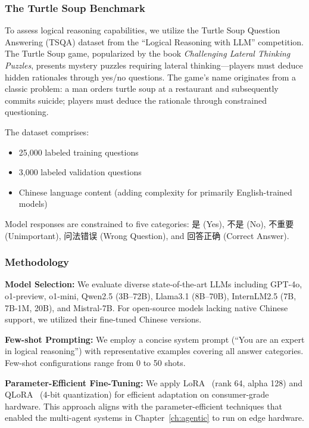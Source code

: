 \subsubsection{The Turtle Soup Benchmark}

To assess logical reasoning capabilities, we utilize the Turtle Soup Question Answering (TSQA) dataset from the ``Logical Reasoning with LLM'' competition. The Turtle Soup game, popularized by the book \textit{Challenging Lateral Thinking Puzzles}, presents mystery puzzles requiring lateral thinking---players must deduce hidden rationales through yes/no questions. The game's name originates from a classic problem: a man orders turtle soup at a restaurant and subsequently commits suicide; players must deduce the rationale through constrained questioning.

The dataset comprises:
\begin{itemize}[leftmargin=*]
    \item 25,000 labeled training questions
    \item 3,000 labeled validation questions
    \item Chinese language content (adding complexity for primarily English-trained models)
\end{itemize}

Model responses are constrained to five categories: 是 (Yes), 不是 (No), 不重要 (Unimportant), 问法错误 (Wrong Question), and 回答正确 (Correct Answer).

\subsubsection{Methodology}

\textbf{Model Selection:} We evaluate diverse state-of-the-art LLMs including GPT-4o, o1-preview, o1-mini, Qwen2.5 (3B--72B), Llama3.1 (8B--70B), InternLM2.5 (7B, 7B-1M, 20B), and Mistral-7B. For open-source models lacking native Chinese support, we utilized their fine-tuned Chinese versions.

\textbf{Few-shot Prompting:} We employ a concise system prompt (``You are an expert in logical reasoning'') with representative examples covering all answer categories. Few-shot configurations range from 0 to 50 shots.

\textbf{Parameter-Efficient Fine-Tuning:} We apply LoRA~\cite{hu2022lora} (rank 64, alpha 128) and QLoRA~\cite{dettmers2023qlora} (4-bit quantization) for efficient adaptation on consumer-grade hardware. This approach aligns with the parameter-efficient techniques that enabled the multi-agent systems in Chapter~\ref{ch:agentic} to run on edge hardware.

